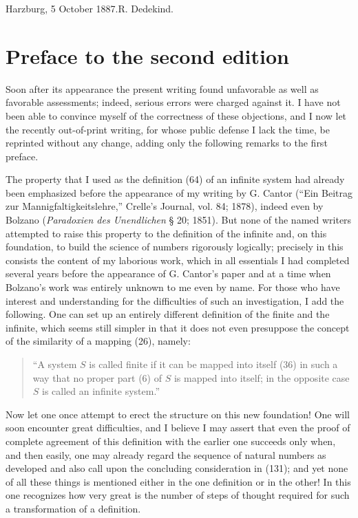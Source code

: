 \documentclass[11pt]{article}
\begin{document}
\begin{flushright}Harzburg, 5 October 1887.\qquad R. Dedekind.\end{flushright}

\section*{Preface to the second edition}

Soon after its appearance the present writing found unfavorable as well as favorable assessments; indeed, serious errors were charged against it. I have not been able to convince myself of the correctness of these objections, and I now let the recently out-of-print writing, for whose public defense I lack the time, be reprinted without any change, adding only the following remarks to the first preface.

The property that I used as the definition (64) of an infinite system had already been emphasized before the appearance of my writing by G. Cantor (``Ein Beitrag zur Mannigfaltigkeitslehre,'' Crelle's Journal, vol. 84; 1878), indeed even by Bolzano (\emph{Paradoxien des Unendlichen} § 20; 1851). But none of the named writers attempted to raise this property to the definition of the infinite and, on this foundation, to build the science of numbers rigorously logically; precisely in this consists the content of my laborious work, which in all essentials I had completed several years before the appearance of G. Cantor's paper and at a time when Bolzano's work was entirely unknown to me even by name. For those who have interest and understanding for the difficulties of such an investigation, I add the following. One can set up an entirely different definition of the finite and the infinite, which seems still simpler in that it does not even presuppose the concept of the similarity of a mapping (26), namely:

\begin{quote}``A system $S$ is called finite if it can be mapped into itself (36) in such a way that no proper part (6) of $S$ is mapped into itself; in the opposite case $S$ is called an infinite system.''\end{quote}

Now let one once attempt to erect the structure on this new foundation! One will soon encounter great difficulties, and I believe I may assert that even the proof of complete agreement of this definition with the earlier one succeeds only when, and then easily, one may already regard the sequence of natural numbers as developed and also call upon the concluding consideration in (131); and yet none of all these things is mentioned either in the one definition or in the other! In this one recognizes how very great is the number of steps of thought required for such a transformation of a definition.
\end{document}
